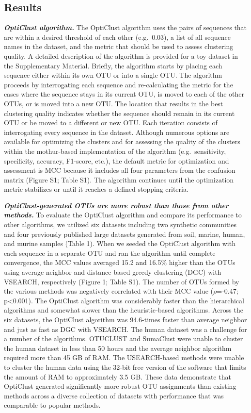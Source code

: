 \documentclass[11pt,]{article}
\begin{document}
\subsection{Results}\label{results}

\textbf{\emph{OptiClust algorithm.}} The OptiClust algorithm uses the
pairs of sequences that are within a desired threshold of each other
(e.g.~0.03), a list of all sequence names in the dataset, and the metric
that should be used to assess clustering quality. A detailed description
of the algorithm is provided for a toy dataset in the Supplementary
Material. Briefly, the algorithm starts by placing each sequence either
within its own OTU or into a single OTU. The algorithm proceeds by
interrogating each sequence and re-calculating the metric for the cases
where the sequence stays in its current OTU, is moved to each of the
other OTUs, or is moved into a new OTU. The location that results in the
best clustering quality indicates whether the sequence should remain in
its current OTU or be moved to a different or new OTU. Each iteration
consists of interrogating every sequence in the dataset. Although
numerous options are available for optimizing the clusters and for
assessing the quality of the clusters within the mothur-based
implementation of the algorithm (e.g.~sensitivity, specificity,
accuracy, F1-score, etc.), the default metric for optimization and
assessment is MCC because it includes all four parameters from the
confusion matrix (Figure S1; Table S1). The algorithm continues until
the optimization metric stabilizes or until it reaches a defined
stopping criteria.

\textbf{\emph{OptiClust-generated OTUs are more robust than those from
other methods.}} To evaluate the OptiClust algorithm and compare its
performance to other algorithms, we utilized six datasets including two
synthetic communities and four previously published large datasets
generated from soil, marine, human, and murine samples (Table 1). When
we seeded the OptiClust algorithm with each sequence in a separate OTU
and ran the algorithm until complete convergence, the MCC values
averaged 15.2 and 16.5\% higher than the OTUs using average neighbor and
distance-based greedy clustering (DGC) with VSEARCH, respectively
(Figure 1; Table S1). The number of OTUs formed by the various methods
was negatively correlated with their MCC value (\(\rho\)=-0.47;
p\textless{}0.001). The OptiClust algorithm was considerably faster than
the hierarchical algorithms and somewhat slower than the heuristic-based
algorithms. Across the six datasets, the OptiClust algorithm was
94.6-times faster than average neighbor and just as fast as DGC with
VSEARCH. The human dataset was a challenge for a number of the
algorithms. OTUCLUST and SumaClust were unable to cluster the human
dataset in less than 50 hours and the average neighbor algorithm
required more than 45 GB of RAM. The USEARCH-based methods were unable
to cluster the human data using the 32-bit free version of the software
that limits the amount of RAM to approximately 3.5 GB. These data
demonstrate that OptiClust generated significantly more robust OTU
assignments than existing methods across a diverse collection of
datasets with performance that was comparable to popular methods.
\end{document}
